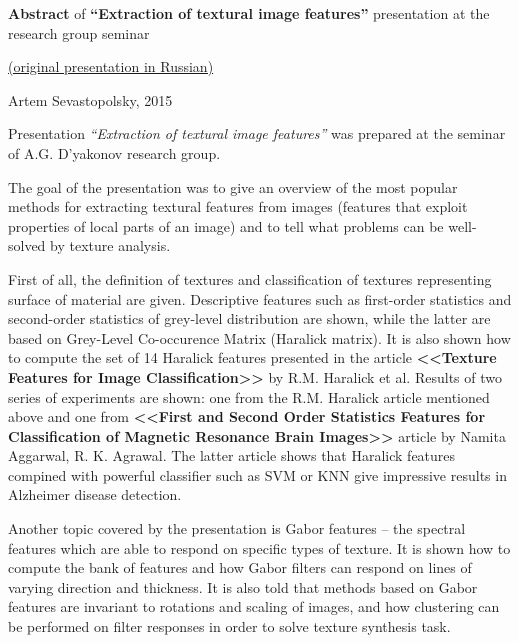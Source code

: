 \documentclass[11pt]{article}
\begin{document}
	{\large {\bf Abstract} of {\bf``Extraction of textural image features''} presentation at the research group seminar
	
	 \href{http://www.machinelearning.ru/wiki/images/1/1d/Textures_slides_Sevastopolsky.pdf}{(original presentation in Russian)}
	\newline
	
	{Artem Sevastopolsky, 2015}}
	\newline
	\newline
	\newline
	\par
	Presentation \emph{``Extraction of textural image features''} was prepared at the seminar of A.G. D'yakonov research group. \newline
	
	The goal of the presentation was to give an overview of the most popular methods for extracting textural features from images (features that exploit properties of local parts of an image) and to tell what problems can be well-solved by texture analysis.\newline
	
	First of all, the definition of textures and classification of textures representing surface of material are given. Descriptive features such as first-order statistics and second-order statistics of grey-level distribution are shown, while the latter are based on Grey-Level Co-occurence Matrix (Haralick matrix). It is also shown how to compute the set of 14 Haralick features presented in the article {\bf <<Texture Features for Image Classification>>} by R.M. Haralick et al. Results of two series of experiments are shown: one from the R.M. Haralick article mentioned above and one from {\bf <<First and Second Order Statistics Features for Classification of Magnetic Resonance Brain Images>>} article by Namita Aggarwal, R. K. Agrawal. The latter article shows that Haralick features compined with powerful classifier such as SVM or KNN give impressive results in Alzheimer disease detection.\newline
	
	Another topic covered by the presentation is Gabor features -- the spectral features which are able to respond on specific types of texture. It is shown how to compute the bank of features and how Gabor filters can respond on lines of varying direction and thickness. It is also told that methods based on Gabor features are invariant to rotations and scaling of images, and how clustering can be performed on filter responses in order to solve texture synthesis task.\newline
	
\end{document}
